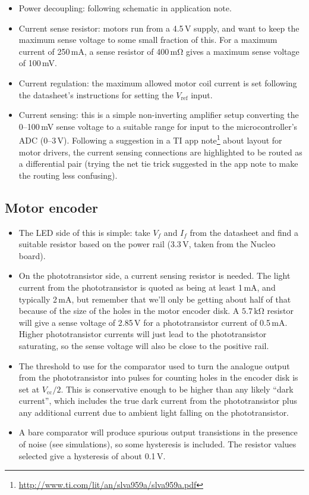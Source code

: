 \documentclass[a4paper,11pt,article]{memoir}
\begin{document}
\begin{itemize}
  \item{Power decoupling: following schematic in application note.}
  \item{Current sense resistor: motors run from a 4.5\,V supply, and
    want to keep the maximum sense voltage to some small fraction of
    this. For a maximum current of 250\,mA, a sense resistor of
    400\,$\mathrm{m\Omega}$ gives a maximum sense voltage of 100\,mV.}
  \item{Current regulation: the maximum allowed motor coil current is
    set following the datasheet's instructions for setting the
    $V_\mathrm{ref}$ input.}
  \item{Current sensing: this is a simple non-inverting amplifier
    setup converting the 0--100\,mV sense voltage to a suitable range
    for input to the microcontroller's ADC (0--3\,V). Following a
    suggestion in a TI app
    note\footnote{\url{http://www.ti.com/lit/an/slva959a/slva959a.pdf}}
    about layout for motor drivers, the current sensing connections
    are highlighted to be routed as a differential pair (trying the
    net tie trick suggested in the app note to make the routing less
    confusing).}
\end{itemize}

\subsection*{Motor encoder}

\begin{itemize}
  \item{The LED side of this is simple: take $V_f$ and $I_f$ from the
    datasheet and find a suitable resistor based on the power rail
    (3.3\,V, taken from the Nucleo board).}
  \item{On the phototransistor side, a current sensing resistor is
    needed. The light current from the phototransistor is quoted as
    being at least 1\,mA, and typically 2\,mA, but remember that we'll
    only be getting about half of that because of the size of the
    holes in the motor encoder disk. A $5.7\,\mathrm{k\Omega}$
    resistor will give a sense voltage of 2.85\,V for a phototransistor
    current of 0.5\,mA. Higher phototransistor currents will just lead
    to the phototransistor saturating, so the sense voltage will also
    be close to the positive rail.}
  \item{The threshold to use for the comparator used to turn the
    analogue output from the phototransistor into pulses for counting
    holes in the encoder disk is set at $V_{\mathrm{cc}} / 2$. This is
    conservative enough to be higher than any likely ``dark current'',
    which includes the true dark current from the phototransistor plus
    any additional current due to ambient light falling on the
    phototransistor.}
  \item{A bare comparator will produce spurious output transistions in
    the presence of noise (see simulations), so some hysteresis is
    included. The resistor values selected give a hysteresis of about
    0.1\,V.}
\end{itemize}
\end{document}
